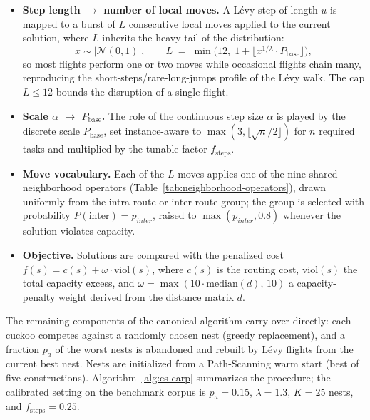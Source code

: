 \begin{itemize}
  \item \textbf{Step length $\to$ number of local moves.} A L\'evy step of
    length $u$ is mapped to a burst of $L$ consecutive local moves applied to
    the current solution, where $L$ inherits the heavy tail of the
    distribution:
    \begin{equation}
      x \sim |\mathcal{N}(0,1)|, \qquad
      L \;=\; \min\!\bigl(12,\; 1 + \lfloor x^{1/\lambda} \cdot
      P_{\mathrm{base}} \rfloor\bigr),
      \label{eq:cs-discrete-levy}
    \end{equation}
    so most flights perform one or two moves while occasional flights chain
    many, reproducing the short-steps/rare-long-jumps profile of the L\'evy
    walk. The cap $L \leq 12$ bounds the disruption of a single flight.
  \item \textbf{Scale $\alpha$ $\to$ $P_{\mathrm{base}}$.} The role of the
    continuous step size $\alpha$ is played by the discrete scale
    $P_{\mathrm{base}}$, set instance-aware to
    $\max(3, \lfloor \sqrt{n}/2 \rfloor)$ for $n$ required tasks and
    multiplied by the tunable factor $f_{\mathrm{steps}}$.
  \item \textbf{Move vocabulary.} Each of the $L$ moves applies one of the
    nine shared neighborhood operators
    (Table~\ref{tab:neighborhood-operators}), drawn uniformly from the
    intra-route or inter-route group; the group is selected with probability
    $P(\text{inter}) = p_{inter}$, raised to $\max(p_{inter}, 0.8)$ whenever
    the solution violates capacity.
  \item \textbf{Objective.} Solutions are compared with the penalized cost
    $f(s) = c(s) + \omega \cdot \mathrm{viol}(s)$, where $c(s)$ is the
    routing cost, $\mathrm{viol}(s)$ the total capacity excess, and
    $\omega = \max(10 \cdot \mathrm{median}(d),\, 10)$ a capacity-penalty
    weight derived from the distance matrix $d$.
\end{itemize}

The remaining components of the canonical algorithm carry over directly: each
cuckoo competes against a randomly chosen nest (greedy replacement), and a
fraction $p_a$ of the worst nests is abandoned and rebuilt by L\'evy flights
from the current best nest. Nests are initialized from a Path-Scanning warm
start (best of five constructions). Algorithm~\ref{alg:cs-carp} summarizes
the procedure; the calibrated setting on the benchmark corpus is
$p_a = 0.15$, $\lambda = 1.3$, $K = 25$ nests, and
$f_{\mathrm{steps}} = 0.25$.

